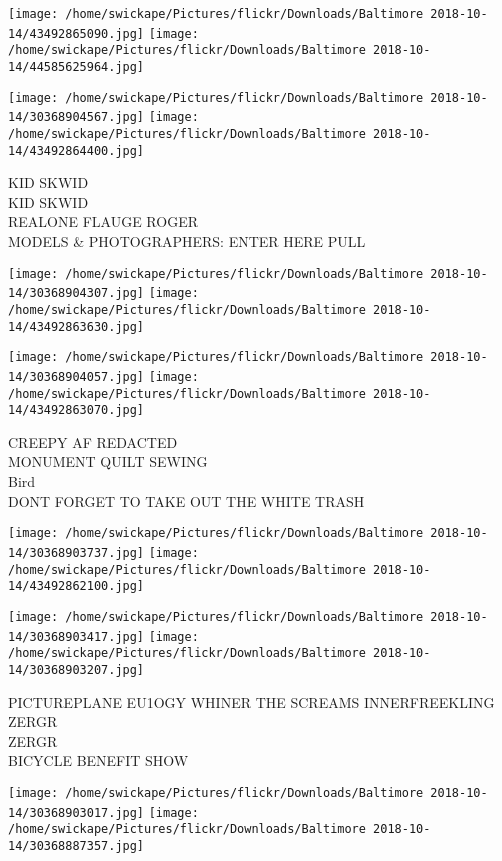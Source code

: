\documentclass[10pt,letterpaper]{article}
\begin{document}
\texttt{[image: /home/swickape/Pictures/flickr/Downloads/Baltimore 2018-10-14/43492865090.jpg]}
\texttt{[image: /home/swickape/Pictures/flickr/Downloads/Baltimore 2018-10-14/44585625964.jpg]}

\texttt{[image: /home/swickape/Pictures/flickr/Downloads/Baltimore 2018-10-14/30368904567.jpg]}
\texttt{[image: /home/swickape/Pictures/flickr/Downloads/Baltimore 2018-10-14/43492864400.jpg]}

KID SKWID\\
KID SKWID\\
REALONE FLAUGE ROGER\\
MODELS \& PHOTOGRAPHERS: ENTER HERE PULL\\
\pagebreak

\texttt{[image: /home/swickape/Pictures/flickr/Downloads/Baltimore 2018-10-14/30368904307.jpg]}
\texttt{[image: /home/swickape/Pictures/flickr/Downloads/Baltimore 2018-10-14/43492863630.jpg]}

\texttt{[image: /home/swickape/Pictures/flickr/Downloads/Baltimore 2018-10-14/30368904057.jpg]}
\texttt{[image: /home/swickape/Pictures/flickr/Downloads/Baltimore 2018-10-14/43492863070.jpg]}

CREEPY AF REDACTED\\
MONUMENT QUILT SEWING\\
Bird\\
DONT FORGET TO TAKE OUT THE WHITE TRASH\\
\pagebreak

\texttt{[image: /home/swickape/Pictures/flickr/Downloads/Baltimore 2018-10-14/30368903737.jpg]}
\texttt{[image: /home/swickape/Pictures/flickr/Downloads/Baltimore 2018-10-14/43492862100.jpg]}

\texttt{[image: /home/swickape/Pictures/flickr/Downloads/Baltimore 2018-10-14/30368903417.jpg]}
\texttt{[image: /home/swickape/Pictures/flickr/Downloads/Baltimore 2018-10-14/30368903207.jpg]}

PICTUREPLANE EU1OGY WHINER THE SCREAMS INNERFREEKLING\\
ZERGR\\
ZERGR\\
BICYCLE BENEFIT SHOW\\
\pagebreak

\texttt{[image: /home/swickape/Pictures/flickr/Downloads/Baltimore 2018-10-14/30368903017.jpg]}
\texttt{[image: /home/swickape/Pictures/flickr/Downloads/Baltimore 2018-10-14/30368887357.jpg]}
\end{document}
